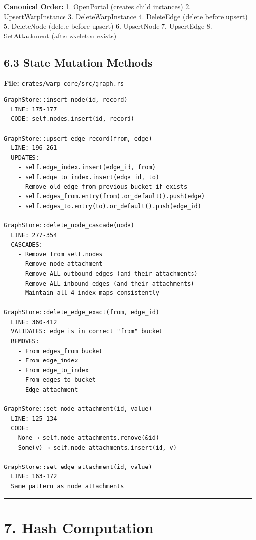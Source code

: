 \documentclass[
]{book}
\begin{document}
\textbf{Canonical Order:} 1. OpenPortal (creates child instances) 2.
UpsertWarpInstance 3. DeleteWarpInstance 4. DeleteEdge (delete before
upsert) 5. DeleteNode (delete before upsert) 6. UpsertNode 7. UpsertEdge
8. SetAttachment (after skeleton exists)

\subsection{6.3 State Mutation Methods}\label{state-mutation-methods}

\textbf{File:} \texttt{crates/warp-core/src/graph.rs}

\begin{verbatim}
GraphStore::insert_node(id, record)
  LINE: 175-177
  CODE: self.nodes.insert(id, record)

GraphStore::upsert_edge_record(from, edge)
  LINE: 196-261
  UPDATES:
    - self.edge_index.insert(edge_id, from)
    - self.edge_to_index.insert(edge_id, to)
    - Remove old edge from previous bucket if exists
    - self.edges_from.entry(from).or_default().push(edge)
    - self.edges_to.entry(to).or_default().push(edge_id)

GraphStore::delete_node_cascade(node)
  LINE: 277-354
  CASCADES:
    - Remove from self.nodes
    - Remove node attachment
    - Remove ALL outbound edges (and their attachments)
    - Remove ALL inbound edges (and their attachments)
    - Maintain all 4 index maps consistently

GraphStore::delete_edge_exact(from, edge_id)
  LINE: 360-412
  VALIDATES: edge is in correct "from" bucket
  REMOVES:
    - From edges_from bucket
    - From edge_index
    - From edge_to_index
    - From edges_to bucket
    - Edge attachment

GraphStore::set_node_attachment(id, value)
  LINE: 125-134
  CODE:
    None → self.node_attachments.remove(&id)
    Some(v) → self.node_attachments.insert(id, v)

GraphStore::set_edge_attachment(id, value)
  LINE: 163-172
  Same pattern as node attachments
\end{verbatim}

\begin{center}\rule{0.5\linewidth}{0.5pt}\end{center}

\section{7. Hash Computation}\label{hash-computation}
\end{document}
